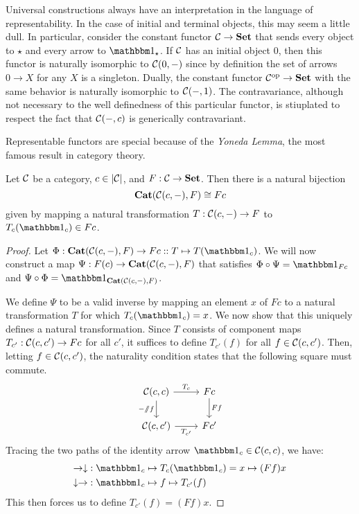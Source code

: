 Universal constructions always have an interpretation in the language of representability. In the case of initial and terminal objects, this may seem a little dull. In particular, consider the constant functor $\mathcal{C}\to\mathbf{Set}$ that sends every object to $\star$ and every arrow to $\Id{\star}$. If $\mathcal{C}$ has an initial object $0$, then this functor is naturally isomorphic to $\mathcal{C}(0,-)$ since by definition the set of arrows $0\to X$ for any $X$ is a singleton. Dually, the constant functor $\mathcal{C}^{\text{op}}\to\mathbf{Set}$ with the same behavior is naturally isomorphic to $\mathcal{C}(-,1)$. The contravariance, although not necessary to the well definedness of this particular functor, is stiuplated to respect the fact that $\mathcal{C}(-,c)$ is generically contravariant.

Representable functors are special because of the \emph{Yoneda Lemma}, the most famous result in category theory.

\begin{thm} Let $\mathcal{C}$ be a category, $c\in|\mathcal{C}|$, and $F:\mathcal{C}\to\mathbf{Set}$. Then there is a natural bijection
\[\mathbf{Cat}(\mathcal{C}(c,-),F)\cong Fc\]
given by mapping a natural transformation $T:\mathcal{C}(c,-)\to F$ to $T_c(\Id{c})\in Fc$.
\end{thm}

\begin{proof}
Let $\Phi:\Cat(\mcC(c,-),F)\to Fc::T\mapsto T(\Id{c})$. We will now construct a map $\Psi: F(c)\to \mathbf{Cat}(\mathcal{C}(c,-),F)$ that satisfies $\Phi\circ\Psi=\Id{Fc}$ and $\Psi\circ\Phi=\Id{\Cat(\mcC(c,-),F)}$.

We define $\Psi$ to be a valid inverse by mapping an element $x$ of $Fc$ to a natural transformation $T$ for which $T_c(\Id{c})=x$. We now show that this uniquely defines a natural transformation. Since $T$ consists of component maps $T_{c'}:\mathcal{C}(c,c')\to Fc$ for all $c'$, it suffices to define $T_{c'}(f)$ for all $f\in\mathcal{C}(c, c')$. Then, letting $f\in\mathcal{C}(c,c')$, the naturality condition states that the following square must commute.
\[
\begin{tikzcd}
\mcC(c,c) \arrow[r,"T_c"] \arrow[d,"-\then f"'] & Fc \arrow[d,"Ff"] \\
\mcC(c,c') \arrow[r,"T_{c'}"'] & Fc'
\end{tikzcd}
\]
Tracing the two paths of the identity arrow $\Id{c}\in\mcC(c,c)$, we have:
\begin{align*}
    \to\downarrow &: \Id{c}\mapsto T_c(\Id{c})=x\mapsto (Ff)x \\
    \downarrow\to &: \Id{c}\mapsto f\mapsto T_{c'}(f)
\end{align*}
This then forces us to define $T_{c'}(f)=(Ff)x$.
\end{proof}

